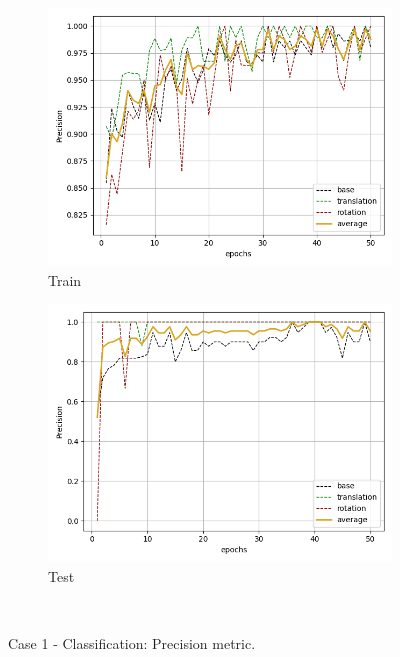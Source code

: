 \begin{figure}[H]
    \begin{subfigure}{.48\linewidth}
    \centering
    \includegraphics[scale=0.45]{Img/cls_nonoise_train_prec.png}
    \caption{Train}
    \end{subfigure}
    \begin{subfigure}{.48\linewidth}
    \centering
    \includegraphics[scale=0.45]{Img/cls_nonoise_test_prec.png}
    \caption{Test}
    \end{subfigure}\\
    \caption{Case 1 - Classification: Precision metric.}
\end{figure}
